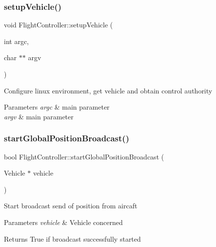 \subsubsection{\texorpdfstring{setup\+Vehicle()}{setupVehicle()}}
{\footnotesize\ttfamily void Flight\+Controller\+::setup\+Vehicle (\begin{DoxyParamCaption}\item[{int}]{argc,  }\item[{char $\ast$$\ast$}]{argv }\end{DoxyParamCaption})}

Configure linux environment, get vehicle and obtain control authority 
\begin{DoxyParams}{Parameters}
{\em argc} & main parameter \\
\hline
{\em argv} & main parameter \\
\hline
\end{DoxyParams}
\mbox{\label{class_m210_1_1_flight_controller_adc83a3c84c9472f0c2a62c1949cfdbfc}} 
\subsubsection{\texorpdfstring{start\+Global\+Position\+Broadcast()}{startGlobalPositionBroadcast()}}
{\footnotesize\ttfamily bool Flight\+Controller\+::start\+Global\+Position\+Broadcast (\begin{DoxyParamCaption}\item[{Vehicle $\ast$}]{vehicle }\end{DoxyParamCaption})\hspace{0.3cm}{\ttfamily [static]}}

Start broadcast send of position from aircaft 
\begin{DoxyParams}{Parameters}
{\em vehicle} & Vehicle concerned \\
\hline
\end{DoxyParams}
\begin{DoxyReturn}{Returns}
True if broadcast successfully started 
\end{DoxyReturn}
\mbox{\label{class_m210_1_1_flight_controller_a60d0858a9cfd91bc362ec8b5b894d3b4}} 
